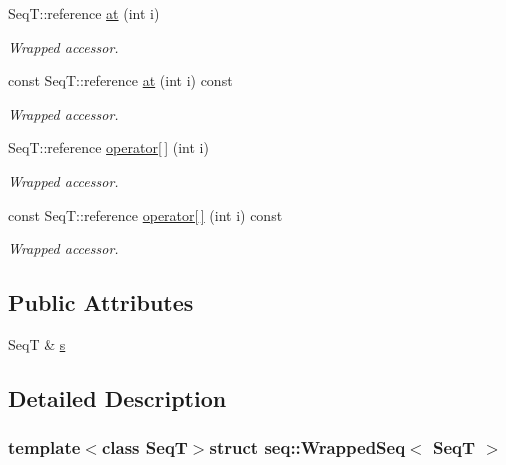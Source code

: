 \begin{DoxyCompactItemize}
\item 
Seq\-T\-::reference \hyperlink{structseq_1_1_wrapped_seq_a2267a0d93467dc4db6b64a9914a0e265}{at} (int i)
\begin{DoxyCompactList}\small\item\em Wrapped accessor. \end{DoxyCompactList}\item 
const Seq\-T\-::reference \hyperlink{structseq_1_1_wrapped_seq_a09864746e7dfb9e0d1ef6ebc59a9a4e8}{at} (int i) const 
\begin{DoxyCompactList}\small\item\em Wrapped accessor. \end{DoxyCompactList}\item 
Seq\-T\-::reference \hyperlink{structseq_1_1_wrapped_seq_a7ffd5783fc6d50fad65f89e6e2cc8489}{operator\mbox{[}$\,$\mbox{]}} (int i)
\begin{DoxyCompactList}\small\item\em Wrapped accessor. \end{DoxyCompactList}\item 
const Seq\-T\-::reference \hyperlink{structseq_1_1_wrapped_seq_a562c969d3a8f3c8aeede89d25747ba64}{operator\mbox{[}$\,$\mbox{]}} (int i) const 
\begin{DoxyCompactList}\small\item\em Wrapped accessor. \end{DoxyCompactList}\end{DoxyCompactItemize}

\subsection*{Public Attributes}
\begin{DoxyCompactItemize}
\item 
Seq\-T \& \hyperlink{structseq_1_1_wrapped_seq_a838d548016ce08b745cb29dbee635437}{s}
\end{DoxyCompactItemize}


\subsection{Detailed Description}
\subsubsection*{template$<$class Seq\-T$>$struct seq\-::\-Wrapped\-Seq$<$ Seq\-T $>$}

